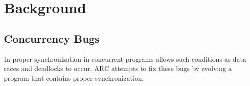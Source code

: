 \documentclass{llncs}
\begin{document}







\section{Background}
\label{sec:background}

\subsection{Concurrency Bugs}
\label{sec:concurrency}

In-proper synchronization in concurrent programs allows such conditions as data
races and deadlocks to occur. ARC attempts to fix these bugs by evolving a
program that contains proper synchronization.
\end{document}
